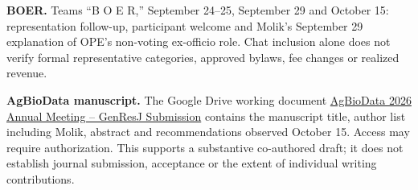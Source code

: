\textbf{BOER.} Teams ``B O E R,'' September 24--25, September 29 and October 15:
representation follow-up, participant welcome and Molik's September 29 explanation
of OPE's non-voting ex-officio role. Chat inclusion alone does not verify formal
representative categories, approved bylaws, fee changes or realized revenue.

\textbf{AgBioData manuscript.} The Google Drive working document
\href{https://docs.google.com/document/d/1yLHUTFwYh6Zshuxk4uQm9R8jaHxIWBJsyYFYpqIryRQ/edit}{AgBioData 2026 Annual Meeting -- GenResJ Submission}
contains the manuscript title, author list including Molik, abstract and
recommendations observed October 15. Access may require authorization.
This supports a substantive co-authored draft; it does not establish journal
submission, acceptance or the extent of individual writing contributions.
